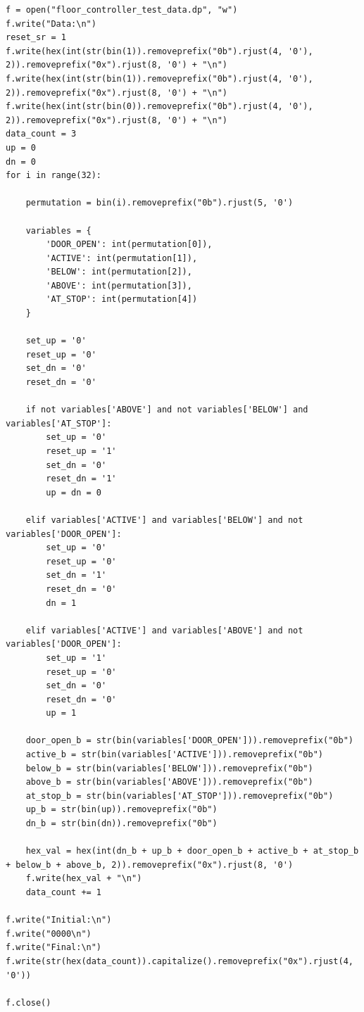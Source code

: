 \documentclass[a4paper]{article}
\begin{document}
\begin{verbatim}
f = open("floor_controller_test_data.dp", "w")
f.write("Data:\n")
reset_sr = 1
f.write(hex(int(str(bin(1)).removeprefix("0b").rjust(4, '0'), 2)).removeprefix("0x").rjust(8, '0') + "\n")
f.write(hex(int(str(bin(1)).removeprefix("0b").rjust(4, '0'), 2)).removeprefix("0x").rjust(8, '0') + "\n")
f.write(hex(int(str(bin(0)).removeprefix("0b").rjust(4, '0'), 2)).removeprefix("0x").rjust(8, '0') + "\n")
data_count = 3
up = 0
dn = 0
for i in range(32):

    permutation = bin(i).removeprefix("0b").rjust(5, '0')
    
    variables = {
        'DOOR_OPEN': int(permutation[0]),
        'ACTIVE': int(permutation[1]),
        'BELOW': int(permutation[2]),
        'ABOVE': int(permutation[3]),
        'AT_STOP': int(permutation[4])
    }

    set_up = '0'
    reset_up = '0'
    set_dn = '0'
    reset_dn = '0'

    if not variables['ABOVE'] and not variables['BELOW'] and variables['AT_STOP']:
        set_up = '0'
        reset_up = '1'
        set_dn = '0'
        reset_dn = '1'
        up = dn = 0

    elif variables['ACTIVE'] and variables['BELOW'] and not variables['DOOR_OPEN']:
        set_up = '0'
        reset_up = '0'
        set_dn = '1'
        reset_dn = '0'
        dn = 1

    elif variables['ACTIVE'] and variables['ABOVE'] and not variables['DOOR_OPEN']:
        set_up = '1'
        reset_up = '0'
        set_dn = '0'
        reset_dn = '0'
        up = 1

    door_open_b = str(bin(variables['DOOR_OPEN'])).removeprefix("0b")
    active_b = str(bin(variables['ACTIVE'])).removeprefix("0b")
    below_b = str(bin(variables['BELOW'])).removeprefix("0b")
    above_b = str(bin(variables['ABOVE'])).removeprefix("0b")
    at_stop_b = str(bin(variables['AT_STOP'])).removeprefix("0b")
    up_b = str(bin(up)).removeprefix("0b")
    dn_b = str(bin(dn)).removeprefix("0b")

    hex_val = hex(int(dn_b + up_b + door_open_b + active_b + at_stop_b + below_b + above_b, 2)).removeprefix("0x").rjust(8, '0')
    f.write(hex_val + "\n")
    data_count += 1

f.write("Initial:\n")
f.write("0000\n")
f.write("Final:\n")
f.write(str(hex(data_count)).capitalize().removeprefix("0x").rjust(4, '0'))

f.close()
\end{verbatim}
\end{document}
